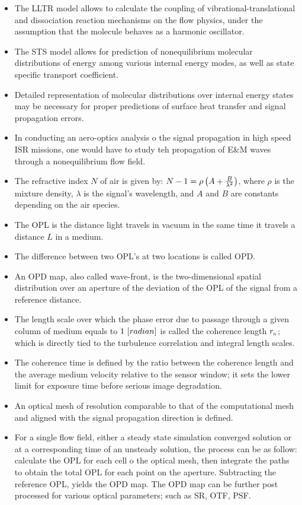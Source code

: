 \begin{itemize}
            \item The LLTR model allows to calculate the coupling of vibrational-translational and dissociation reaction mechanisms on the flow physics, under the assumption that the molecule behaves as a harmonic oscillator. 
            \item The STS model allows for prediction of nonequilibrium molecular distributions of energy among various internal energy modes, as well as state specific transport coefficient.
            \item Detailed representation of molecular distributions over internal energy states may be necessary for proper predictions of surface heat transfer and signal propagation errors.
            \item In conducting an aero-optics analysis o the signal propagation in high speed ISR missions, one would have to study teh propagation of E\&M waves through a nonequilibrium flow field.
            \item The refractive index $N$ of air is given by: $N-1 = \rho\left(A+\frac{B}{\lambda^2}\right)$, where $\rho$ is the mixture density, $\lambda$ is the signal's wavelength, and $A$ and $B$ are constants depending on the air species. 
            \item The OPL is the distance light travels in vacuum in the same time it travels a distance $L$ in a medium. 
            \item The difference between two OPL's at two locations is called OPD.
            \item An OPD map, also called wave-front, is the two-dimensional spatial distribution over an aperture of the deviation of the OPL of the signal from a reference distance.
            \item The length scale over which the phase error due to passage through a given column of medium equals to $1\,\left[radian\right]$ is called the coherence length $r_{_{0}}$; which is directly tied to the turbulence correlation and integral length scales. 
            \item The coherence time is defined by the ratio between the coherence length and the average medium velocity relative to the sensor window; it sets the lower limit for exposure time before serious image degradation. 
            \item An optical mesh of resolution comparable to that of the computational mesh and aligned with the signal propagation direction is defined. 
            \item For a single flow field, either a steady state simulation converged solution or at a corresponding time of an unsteady solution, the process can be as follow: calculate the OPL for each cell o the optical mesh, then integrate the paths to obtain the total OPL for each point on the aperture. Subtracting the reference OPL, yields the OPD map. The OPD map can be further post processed for various optical parameters; such as SR, OTF, PSF.   
        \end{itemize}


